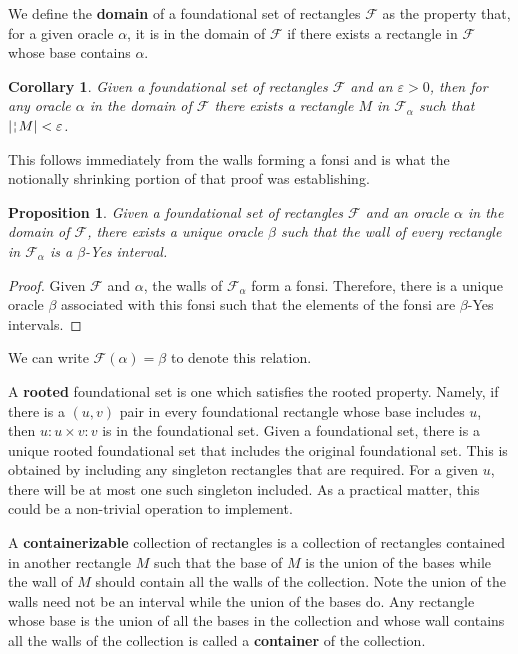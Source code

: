 \documentclass[12pt]{article}
\newtheorem{corollary}{Corollary}[subsection]
\newtheorem{proposition}{Proposition}[subsection]
\begin{document}
We define the \textbf{domain} of a foundational set of rectangles $\mathcal{F}$ as the property that, for a given oracle $\alpha$, it is in the domain of $\mathcal{F}$ if there exists a rectangle in $\mathcal{F}$ whose base contains $\alpha$.

\begin{corollary}\label{cor:fshrink}
Given a foundational set of rectangles $\mathcal{F}$ and an $\varepsilon > 0$, then for any oracle $\alpha$ in the domain of $\mathcal{F}$ there exists a rectangle $M$ in $\mathcal{F}_{\alpha}$ such that $|\wall{M}| < \varepsilon$.
\end{corollary}

This follows immediately from the walls forming a fonsi and is what the notionally shrinking portion of that proof was establishing. 

\begin{proposition}\label{pr:classfun}
Given a foundational set of rectangles $\mathcal{F}$ and an oracle $\alpha$ in the domain of $\mathcal{F}$, there exists a unique oracle $\beta$ such that the wall of every rectangle in $\mathcal{F}_{\alpha}$ is a $\beta$-Yes interval.
\end{proposition}

\begin{proof}
    Given $\mathcal{F}$ and $\alpha$, the walls of $\mathcal{F}_{\alpha}$ form a fonsi. Therefore, there is a unique oracle $\beta$ associated with this fonsi such that the elements of the fonsi are $\beta$-Yes intervals.
\end{proof}

We can write $\mathcal{F}(\alpha) = \beta$ to denote this relation. 

A \textbf{rooted} foundational set is one which satisfies the rooted property. Namely, if there is a $(u,v)$ pair in every foundational rectangle whose base includes $u$, then $u:u \times v:v$ is in the foundational set. Given a foundational set, there is a unique rooted foundational set that includes the original foundational set. This is obtained by including any singleton rectangles that are required. For a given $u$, there will be at most one such singleton included. As a practical matter, this could be a non-trivial operation to implement. 

A \textbf{containerizable} collection of rectangles is a collection of rectangles contained in another rectangle $M$ such that the base of $M$ is the union of the bases while the wall of $M$ should contain all the walls of the collection. Note the union of the walls need not be an interval while the union of the bases do. Any rectangle whose base is the union of all the bases in the collection and whose wall contains all the walls of the collection is called a \textbf{container} of the collection.
\end{document}
